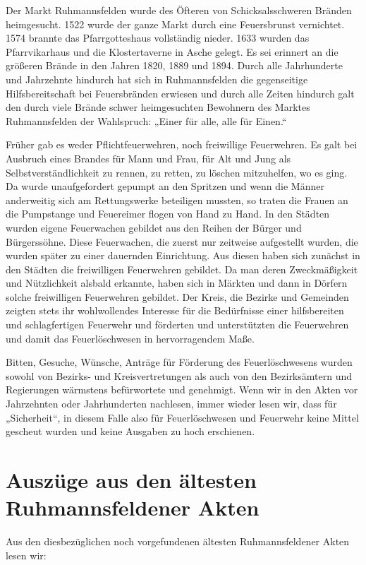 \documentclass[12pt,a4paper]{book}
\begin{document}
Der Markt Ruhmannsfelden wurde des Öfteren von Schicksalsschweren Bränden
heimgesucht. 1522 wurde der ganze Markt durch eine Feuersbrunst vernichtet. 1574
brannte das Pfarrgotteshaus vollständig nieder. 1633 wurden das Pfarrvikarhaus
und die Klostertaverne in Asche gelegt. Es sei erinnert an die größeren Brände
in den Jahren 1820, 1889 und 1894. Durch alle Jahrhunderte und Jahrzehnte
hindurch hat sich in Ruhmannsfelden die gegenseitige Hilfsbereitschaft bei
Feuersbränden erwiesen und durch alle Zeiten hindurch galt den durch viele
Brände schwer heimgesuchten Bewohnern des Marktes Ruhmannsfelden der Wahlspruch:
„Einer für alle, alle für Einen.“

Früher gab es weder Pflichtfeuerwehren, noch freiwillige Feuerwehren. Es galt
bei Ausbruch eines Brandes für Mann und Frau, für Alt und Jung als
Selbstverständlichkeit zu rennen, zu retten, zu löschen mitzuhelfen, wo es ging.
Da wurde unaufgefordert gepumpt an den Spritzen und wenn die Männer anderweitig
sich am Rettungswerke beteiligen mussten, so traten die Frauen an die Pumpstange
und Feuereimer flogen von Hand zu Hand. In den Städten wurden eigene Feuerwachen
gebildet aus den Reihen der Bürger und Bürgerssöhne. Diese Feuerwachen, die
zuerst nur zeitweise aufgestellt wurden, die wurden später zu einer dauernden
Einrichtung. Aus diesen haben sich zunächst in den Städten die freiwilligen
Feuerwehren gebildet. Da man deren Zweckmäßigkeit und Nützlichkeit alsbald
erkannte, haben sich in Märkten und dann in Dörfern solche freiwilligen
Feuerwehren gebildet. Der Kreis, die Bezirke und Gemeinden zeigten stets ihr
wohlwollendes Interesse für die Bedürfnisse einer hilfsbereiten und
schlagfertigen Feuerwehr und förderten und unterstützten die Feuerwehren und
damit das Feuerlöschwesen in hervorragendem Maße.

Bitten, Gesuche, Wünsche, Anträge für Förderung des Feuerlöschwesens wurden
sowohl von Bezirks- und Kreisvertretungen als auch von den Bezirksämtern und
Regierungen wärmstens befürwortete und genehmigt. Wenn wir in den Akten vor
Jahrzehnten oder Jahrhunderten nachlesen, immer wieder lesen wir, dass für
„Sicherheit“, in diesem Falle also für Feuerlöschwesen und Feuerwehr keine
Mittel gescheut wurden und keine Ausgaben zu hoch erschienen.

\chapter{Auszüge aus den ältesten Ruhmannsfeldener Akten}

Aus den diesbezüglichen noch vorgefundenen ältesten Ruhmannsfeldener Akten lesen
wir:
\end{document}
